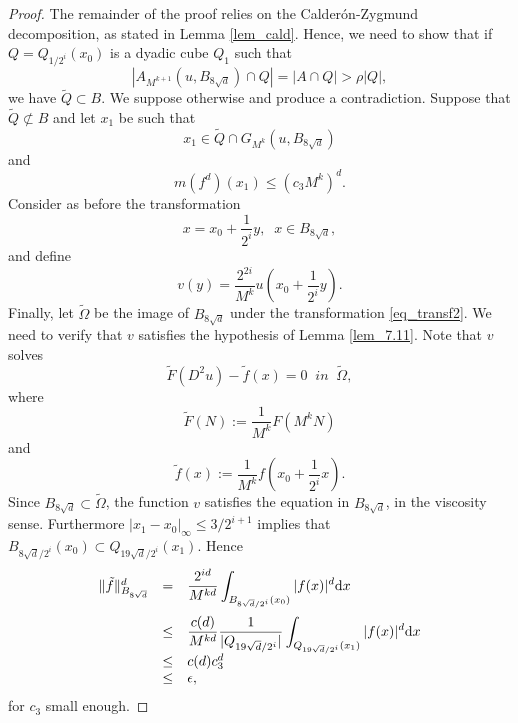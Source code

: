 \documentclass[10pt]{article} %
\begin{document}
\begin{proof}
The remainder of the proof relies on the Calder\'on-Zygmund decomposition, as stated in Lemma \ref{lem_cald}. Hence, we need to show that if $Q = Q_{1/2^i}(x_0)$ is a dyadic cube $Q_1$ such that
\begin{equation}\label{eq_013}
|A_{M^{k+1}}(u,B_{8\sqrt{d}})\cap Q| = |A\cap Q| > \rho|Q|,
\end{equation}
we have $\tilde{Q} \subset B$. We suppose otherwise and produce a contradiction. Suppose that $\tilde{Q} \not\subset B$ and let $x_1$ be such that
\begin{equation}\label{eq_014}
x_1\in\tilde{Q}\cap G_{M^k}(u,B_{8\sqrt{d}})
\end{equation}
and
\begin{equation}\label{eq_015}
m(f^d)(x_1) \leq \left(c_3M^{k}\right)^d.
\end{equation}
Consider as before the transformation 
\begin{equation}\label{eq_transf2}
x = x_0+\frac{1}{2^i}y, \;\;x\in B_{8\sqrt{d}},
\end{equation}
and define
\[
v(y) = \frac{2^{2i}}{M^k}u\left(x_0 + \frac{1}{2^i}y\right).
\]
Finally, let $\tilde{\Omega}$ be the image of $B_{8\sqrt{d}}$ under the transformation \eqref{eq_transf2}. We need to verify that $v$ satisfies the hypothesis of Lemma \ref{lem_7.11}. Note that $v$ solves
\[
	\tilde{F}(D^2u) - \tilde{f}(x) = 0 \;\; in \;\; \tilde{\Omega},
\]
where
\[
\tilde{F}(N) := \frac{1}{M^k}F\left(M^kN\right)
\]
and
\[
\tilde{f}(x) := \frac{1}{M^{k}}f\left(x_0+\frac{1}{2^i}x\right).
\]
Since $B_{8\sqrt{d}} \subset \tilde{\Omega}$, the function $v$ satisfies the equation in $B_{8\sqrt{d}}$, in the viscosity sense. Furthermore $|x_1-x_0|_{\infty} \leq 3/2^{i+1}$ implies that $B_{8\sqrt{d}/2^i}(x_0) \subset Q_{19\sqrt{d}/2^i}(x_1)$. Hence 
\[
\begin{array}{rcl}
\|\tilde{f}\|^d_{B_{8\sqrt{d}}} & = &\displaystyle \frac{2^{id}}{M^{kd}}\int_{B_{8\sqrt{d}/2^i}(x_0)}|f(x)|^d{\rm d}x \vspace{0.2cm}\\
 &\leq & \displaystyle \frac{c(d)}{M^{kd}}\frac{1}{|Q_{19\sqrt{d}/2^i}|}\int_{Q_{19\sqrt{d}/2^i}(x_1)}|f(x)|^d{\rm d}x \\
 & \leq & c(d)c_3^d \\
 & \leq & \epsilon,
\end{array}
\]
for $c_3$ small enough.


\end{proof}
\end{document}
